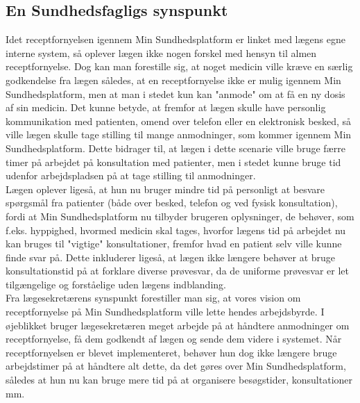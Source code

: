 \subsection{En Sundhedsfagligs synspunkt}
Idet receptfornyelsen igennem Min Sundhedsplatform er linket med lægens egne interne system, så oplever lægen ikke nogen forskel med hensyn til almen receptfornyelse. Dog kan man forestille sig, at noget medicin ville kræve en særlig godkendelse fra lægen således, at en receptfornyelse ikke er mulig igennem Min Sundhedsplatform, men at man i stedet kun kan "anmode" om at få en ny dosis af sin medicin. Det kunne betyde, at fremfor at lægen skulle have personlig kommunikation med patienten, omend over telefon eller en elektronisk besked, så ville lægen skulle tage stilling til mange anmodninger, som kommer igennem Min Sundhedsplatform. Dette bidrager til, at lægen i dette scenarie ville bruge færre timer på arbejdet på konsultation med patienter, men i stedet kunne bruge tid udenfor arbejdspladsen på at tage stilling til anmodninger. \\
Lægen oplever ligeså, at hun nu bruger mindre tid på personligt at besvare spørgsmål fra patienter (både over besked, telefon og ved fysisk konsultation), fordi at Min Sundhedsplatform nu tilbyder brugeren oplysninger, de behøver, som f.eks. hyppighed, hvormed medicin skal tages, hvorfor lægens tid på arbejdet nu kan bruges til "vigtige" konsultationer, fremfor hvad en patient selv ville kunne finde svar på. Dette inkluderer ligeså, at lægen ikke længere behøver at bruge konsultationstid på at forklare diverse prøvesvar, da de uniforme prøvesvar er let tilgængelige og forståelige uden lægens indblanding.\\
Fra lægesekretærens synspunkt forestiller man sig, at vores vision om receptfornyelse på Min Sundhedsplatform ville lette hendes arbejdsbyrde. I øjeblikket bruger lægesekretæren meget arbejde på at håndtere anmodninger om receptfornyelse, få dem godkendt af lægen og sende dem videre i systemet. Når receptfornyelsen er blevet implementeret, behøver hun dog ikke længere bruge arbejdstimer på at håndtere alt dette, da det gøres over Min Sundhedsplatform, således at hun nu kan bruge mere tid på at organisere besøgstider, konsultationer mm. 
